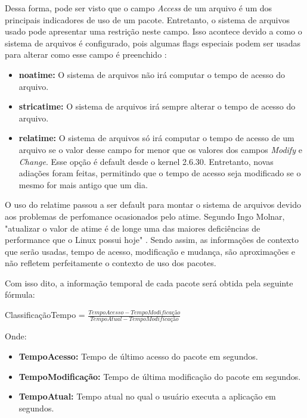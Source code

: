 Dessa forma, pode ser visto que o campo \textit{Access} de um arquivo é um dos
principais indicadores de uso de um pacote. Entretanto, o sistema de arquivos
usado pode apresentar uma
restrição neste campo. Isso acontece devido a como o sistema de arquivos é
configurado, pois algumas flags especiais podem ser usadas para alterar como
esse campo é preenchido \cite{2_wiki.debian.org}:

\begin{itemize}
    \item \textbf{noatime:} O sistema de arquivos não irá computar o tempo de
        acesso do arquivo.
    \item \textbf{stricatime:} O sistema de arquivos irá sempre alterar o tempo
        de acesso do arquivo.
    \item \textbf{relatime:} O sistema de arquivos só irá computar o tempo de
        acesso de um arquivo se o valor desse campo for menor que os valores dos
        campos \textit{Modify} e \textit{Change}. Esse opção é default desde
        o kernel 2.6.30. Entretanto, novas adiações foram feitas, permitindo que
        o tempo de acesso seja modificado se o mesmo for mais antigo que um dia.
\end{itemize}

O uso do relatime passou a ser default para montar o sistema de arquivos devido
aos problemas de perfomance ocasionados pelo atime. Segundo Ingo Molnar, "atualizar o valor
de atime é de longe uma das maiores deficiências de performance que o Linux possui
hoje" \cite{3_corbet_2007}. Sendo assim, as informações de contexto que serão
usadas, tempo de acesso, modificação e mudança, são aproximações e não
refletem perfeitamente o contexto de uso dos pacotes.

Com isso dito, a informação temporal de cada pacote será obtida pela seguinte
fórmula:

ClassificaçãoTempo = $\frac{TempoAcesso - TempoModificação}{TempoAtual -
TempoModificação}$


Onde:

\begin{itemize}
    \item \textbf{TempoAcesso:} Tempo de último acesso do pacote em segundos.
    \item \textbf{TempoModificação:} Tempo de última modificação do pacote em
        segundos.
    \item \textbf{TempoAtual:} Tempo atual no qual o usuário executa a
        aplicação em segundos.
\end{itemize}


